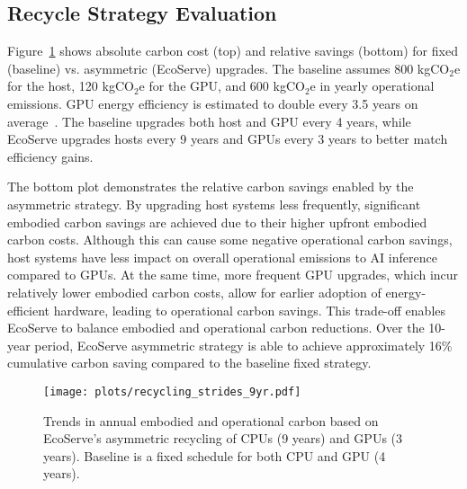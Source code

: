 \subsection{Recycle Strategy Evaluation} \label{sec:recycle-eval}

Figure~\ref{fig:speedup-recycle} shows absolute carbon cost (top) and relative savings (bottom) for fixed (baseline) vs. asymmetric (EcoServe) upgrades. The baseline assumes 800 kgCO$_2$e for the host, 120 kgCO$_2$e for the GPU, and 600 kgCO$_2$e in yearly operational emissions. GPU energy efficiency is estimated to double every 3.5 years on average~\cite{sun2019summarizing}. The baseline upgrades both host and GPU every 4 years, while EcoServe upgrades hosts every 9 years and GPUs every 3 years to better match efficiency gains.



The bottom plot demonstrates the relative carbon savings enabled by the asymmetric strategy. By upgrading host systems less frequently, significant embodied carbon savings are achieved due to their higher upfront embodied carbon costs. Although this can cause some negative operational carbon savings, host systems have less impact on overall operational emissions to AI inference compared to GPUs.
At the same time, more frequent GPU upgrades, which incur relatively lower embodied carbon costs, allow for earlier adoption of energy-efficient hardware, leading to operational carbon savings.
This trade-off enables EcoServe to balance embodied and operational carbon reductions.
Over the 10-year period, EcoServe asymmetric strategy is able to achieve approximately 16\% cumulative carbon saving compared to the baseline fixed strategy. 

\begin{figure}
    \centering
    \texttt{[image: plots/recycling\_strides\_9yr.pdf]}
    \vspace{-1.2em}
    \caption{Trends in annual embodied and operational carbon based on EcoServe's asymmetric recycling of CPUs (9 years) and GPUs (3 years). Baseline is a fixed schedule for both CPU and GPU (4 years). }
    \label{fig:speedup-recycle}
    \vspace{-2em}
\end{figure}










